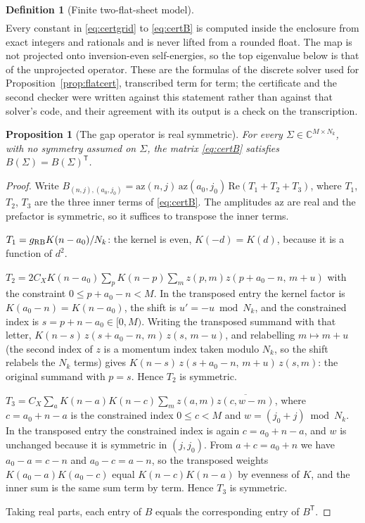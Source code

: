 \documentclass[11pt]{article}
\newtheorem{proposition}[theorem]{Proposition}
\theoremstyle{definition}
\newtheorem{definition}[theorem]{Definition}
\theoremstyle{remark}
\begin{document}
\begin{definition}[Finite two-flat-sheet model]
\begin{equation}
\begin{aligned}
\end{aligned}
\end{equation}
Every constant in \eqref{eq:certgrid} to \eqref{eq:certB} is computed inside the enclosure from exact integers and rationals and is never lifted from a rounded float. The map is not projected onto inversion-even self-energies, so the top eigenvalue below is that of the unprojected operator. These are the formulas of the discrete solver used for Proposition~\ref{prop:flatcert}, transcribed term for term; the certificate and the second checker were written against this statement rather than against that solver's code, and their agreement with its output is a check on the transcription.
\end{definition}

\begin{proposition}[The gap operator is real symmetric]\label{prop:sym}
For every $\Sigma\in\mathbb C^{M\times N_k}$, with no symmetry assumed on $\Sigma$, the matrix \eqref{eq:certB} satisfies $B(\Sigma)=B(\Sigma)^{\mathsf T}$.
\end{proposition}

\begin{proof}
Write $B_{(n,j),(a_0,j_0)}=\mathrm{az}(n,j)\,\mathrm{az}(a_0,j_0)\,\mathrm{Re}(T_1+T_2+T_3)$, where $T_1$, $T_2$, $T_3$ are the three inner terms of \eqref{eq:certB}. The amplitudes $\mathrm{az}$ are real and the prefactor is symmetric, so it suffices to transpose the inner terms.

$T_1=g_{\rm RB}K(n-a_0)/N_k$: the kernel is even, $K(-d)=K(d)$, because it is a function of $d^2$.

$T_2=2C_XK(n-a_0)\sum_{p}K(n-p)\sum_m z(p,m)z(p+a_0-n,\,m+u)$ with the constraint $0\le p+a_0-n<M$. In the transposed entry the kernel factor is $K(a_0-n)=K(n-a_0)$, the shift is $u'=-u\bmod N_k$, and the constrained index is $s=p+n-a_0\in[0,M)$. Writing the transposed summand with that letter, $K(n-s)\,z(s+a_0-n,\,m)\,z(s,\,m-u)$, and relabelling $m\mapsto m+u$ (the second index of $z$ is a momentum index taken modulo $N_k$, so the shift relabels the $N_k$ terms) gives $K(n-s)\,z(s+a_0-n,\,m+u)\,z(s,m)$: the original summand with $p=s$. Hence $T_2$ is symmetric.

$T_3=C_X\sum_{a}K(n-a)K(n-c)\sum_m z(a,m)\overline{z(c,w-m)}$, where $c=a_0+n-a$ is the constrained index $0\le c<M$ and $w=(j_0+j)\bmod N_k$. In the transposed entry the constrained index is again $c=a_0+n-a$, and $w$ is unchanged because it is symmetric in $(j,j_0)$. From $a+c=a_0+n$ we have $a_0-a=c-n$ and $a_0-c=a-n$, so the transposed weights $K(a_0-a)K(a_0-c)$ equal $K(n-c)K(n-a)$ by evenness of $K$, and the inner sum is the same sum term by term. Hence $T_3$ is symmetric.

Taking real parts, each entry of $B$ equals the corresponding entry of $B^{\mathsf T}$.
\end{proof}
\end{document}
